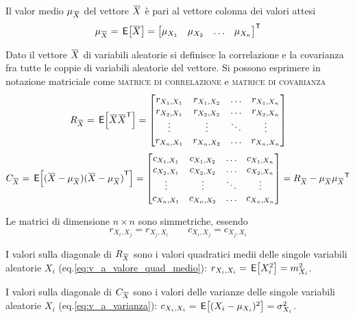 Il valor medio $\mu_\vect{X}$ del vettore $\vect{X}$ è pari al vettore colonna dei valori attesi
\begin{equation}
\mu_\vect{X}=\E{\vect{X}}=\trasp{\begin{bmatrix}\mu_{X_1}&\mu_{X_2}&\dots&\mu_{X_n}\end{bmatrix}}
\end{equation}

Dato il vettore $\vect{X}$ di variabili aleatorie si definisce la correlazione e la covarianza fra tutte le coppie di variabili aleatorie del vettore. Si possono esprimere in notazione matriciale come \textsc{matrice di correlazione} e \textsc{matrice di covarianza}
\begin{equation}\label{eq:matrice_correlazione}
R_\vect{X}=\E{\vect{X}\trasp{\vect{X}}}=\begin{bmatrix}r_{X_1,X_1}&r_{X_1,X_2}&\dots&r_{X_1,X_n}\\r_{X_2,X_1}&r_{X_2,X_2}&\dots&r_{X_2,X_n}\\\vdots&\vdots&\ddots&\vdots\\r_{X_n,X_1}&r_{X_n,X_2}&\dots&r_{X_n,X_n}\end{bmatrix}
\end{equation}
\begin{equation}\label{eq:matrice_covarianza}
C_\vect{X}=\E{(\vect{X}-\mu_\vect{X})\trasp{(\vect{X}-\mu_\vect{X})}}=\begin{bmatrix}c_{X_1,X_1}&c_{X_1,X_2}&\dots&c_{X_1,X_n}\\c_{X_2,X_1}&c_{X_2,X_2}&\dots&c_{X_2,X_n}\\\vdots&\vdots&\ddots&\vdots\\c_{X_n,X_1}&c_{X_n,X_2}&\dots&c_{X_n,X_n}\end{bmatrix}=R_\vect{X}-\mu_\vect{X}\trasp{\mu_\vect{X}}
\end{equation}

Le matrici di dimensione $n\times n$ sono simmetriche, essendo \[r_{X_i,X_j}=r_{X_j,X_i}\qquad c_{X_i,X_j}=c_{X_j,X_i}\]

I valori sulla diagonale di $R_\vect{X}$ sono i valori quadratici medii delle singole variabili aleatorie $X_i$ (eq.\ref{eq:v_a_valore_quad_medio}): $r_{X_i,X_i}=\,{\operatorname{\mathsf{E}}}\!\left[{X^2_i}\right]=m^2_{X_i}$.

I valori sulla diagonale di $C_\vect{X}$ sono i valori delle varianze delle singole variabili aleatorie $X_i$ (eq.\ref{eq:v_a_varianza}): $c_{X_i,X_i}=\,{\operatorname{\mathsf{E}}}\!\left[{(X_i-\mu_{X_i})^2}\right]=\sigma^2_{X_i}$.


